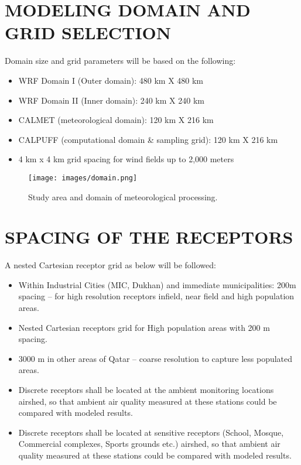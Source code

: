 \section{MODELING DOMAIN AND GRID SELECTION}
Domain size and grid parameters will be based on the following:
\begin{itemize}
\item WRF Domain I (Outer domain): 480 km X 480 km
\item WRF Domain II (Inner domain): 240 km X 240 km
\item CALMET (meteorological domain): 120 km X 216 km
\item CALPUFF (computational domain \& sampling grid): 120 km X 216 km
\item 4 km x 4 km grid spacing for wind fields up to 2,000 meters
\end{itemize}

\begin{figure}[H]
\centering
\texttt{[image: images/domain.png]} 
\caption{Study area and domain of meteorological processing.}
\label{fig:domain}
\end{figure}
%

\section{SPACING OF THE RECEPTORS}
A nested Cartesian receptor grid as below will be followed:

\begin{itemize}
\item Within Industrial Cities (MIC, Dukhan) and immediate municipalities: 200m spacing – for high resolution receptors infield, near field and high population areas.
\item Nested Cartesian receptors grid for High population areas with 200 m spacing.
\item 3000 m in other areas of Qatar – coarse resolution to capture less populated areas.
\item Discrete receptors shall be located at the ambient monitoring locations airshed, so that ambient air quality measured at these stations could be compared with modeled results.
\item Discrete receptors shall be located at sensitive receptors (School, Mosque, Commercial complexes, Sports grounds etc.) airshed, so that ambient air quality measured at these stations could be compared with modeled results.
\end{itemize}

